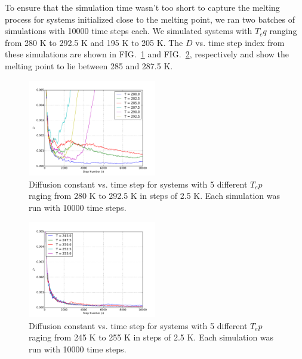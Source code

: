 \documentclass[10pt,showpacs,preprintnumbers,footinbib,amsmath,amssymb,aps,prl,twocolumn,groupedaddress,superscriptaddress,showkeys]{revtex4-1}
\begin{document}
To ensure that the
simulation time wasn't too short to capture the melting process for
systems initialized close to the melting point, we ran two 
batches of simulations with 10000 time steps each. We simulated
systems with $T_eq$ ranging from 280 K to 292.5 K and 195 K to 205 K.
The $D$ vs. time step index from these simulations are shown in
FIG.~\ref{fig:meltPlotsHigh} and FIG.~\ref{fig:meltPlotsLow},
respectively and show the melting point to lie between 285 and 287.5 K.

\begin{figure}
\centering
	\includegraphics[width=0.5\textwidth]{figures/meltPlots.pdf}
	\caption{Diffusion constant vs. time step for systems with 5
	different $T_ep$ raging from 280 K to 292.5 K in steps of 2.5 K. Each
	simulation was run with 10000 time steps.}
	\label{fig:meltPlotsHigh}
\end{figure}

\begin{figure}
\centering
	\includegraphics[width=0.5\textwidth]{figures/meltPlotsLow.pdf}
	\caption{Diffusion constant vs. time step for systems with 5
	different $T_ep$ raging from 245 K to 255 K in steps of 2.5 K. Each
	simulation was run with 10000 time steps.}
	\label{fig:meltPlotsLow}
\end{figure}






\end{document}
